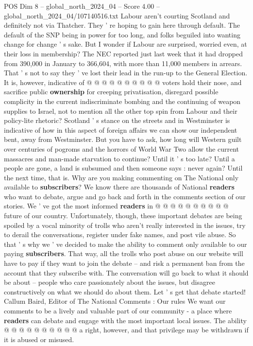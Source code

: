 \begin{textsample}{POS Dim 8 – global\_north\_2024\_04 – Score 4.00 – global\_north\_2024\_04/107140516.txt}
Labour aren't courting Scotland and definitely not via Thatcher.
They ' re hoping to gain here through default.
The default of the SNP being in power for too long, and folks beguiled into wanting change for change ' s sake.
But I wonder if Labour are surprised, worried even, at their loss in membership?
The NEC reported just last week that it had dropped from 390,000 in January to 366,604, with more than 11,000 members in arrears.
That ' s not to say they ' ve lost their lead in the run-up to the General Election.
It is, however, indicative of @ @ @ @ @ @ @ @ @ @ voters hold their nose, and sacrifice public \textbf{ownership} for creeping privatisation, disregard possible complicity in the current indiscriminate bombing and the continuing of weapon supplies to Israel, not to mention all the other top spin from Labour and their policy-lite rhetoric?
Scotland ' s stance on the streets and in Westminster is indicative of how in this aspect of foreign affairs we can show our independent bent, away from Westminster.
But you have to ask, how long will Western guilt over centuries of pogroms and the horrors of World War Two allow the current massacres and man-made starvation to continue?
Until it ' s too late?
Until a people are gone, a land is subsumed and then someone says : never again?
Until the next time, that is.
Why are you making commenting on The National only available to \textbf{subscribers}?
We know there are thousands of National \textbf{readers} who want to debate, argue and go back and forth in the comments section of our stories.
We ' ve got the most informed \textbf{readers} in @ @ @ @ @ @ @ @ @ @ future of our country.
Unfortunately, though, these important debates are being spoiled by a vocal minority of trolls who aren't really interested in the issues, try to derail the conversations, register under fake names, and post vile abuse.
So that ' s why we ' ve decided to make the ability to comment only available to our paying \textbf{subscribers}.
That way, all the trolls who post abuse on our website will have to pay if they want to join the debate -- and risk a permanent ban from the account that they subscribe with.
The conversation will go back to what it should be about -- people who care passionately about the issues, but disagree constructively on what we should do about them.
Let ' s get that debate started!
Callum Baird, Editor of The National Comments : Our rules We want our comments to be a lively and valuable part of our community - a place where \textbf{readers} can debate and engage with the most important local issues.
The ability @ @ @ @ @ @ @ @ @ @ a right, however, and that privilege may be withdrawn if it is abused or misused.

\end{textsample}

